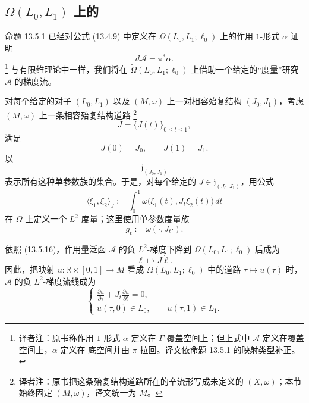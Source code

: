 \subsection{\texorpdfstring{$\Omega(L_0,L_1)$ 上的\termLtwoMetric{}}{道路空间上的 L2 度量}}
\label{subsec:l2-metrics-on-path-space}

命题 13.5.1 已经对公式 (13.4.9) 中定义在
$\Omega(L_0,L_1;\ell_0)$ 上的作用 $1$-形式 $\alpha$ 证明
\[
  d\mathcal A=\pi^*\alpha.
\]
\footnote{译者注：原书称作用 $1$-形式 $\alpha$ 定义在
$\Gamma$-覆盖空间上；但上式中 $\mathcal A$ 定义在覆盖空间上，$\alpha$ 定义在
底空间并由 $\pi$ 拉回。译文依命题 13.5.1 的映射类型补正。}
与有限维\personMorse{}理论中一样，我们将在
$\widetilde\Omega(L_0,L_1;\ell_0)$ 上借助一个给定的“\personRiemann{}度量”研究
$\mathcal A$ 的梯度流。

对每个给定的对子 $(L_0,L_1)$ 以及 $(M,\omega)$ 上一对相容殆复结构
$(J_0,J_1)$，考虑 $(M,\omega)$ 上一条相容殆复结构道路
\footnote{译者注：原书把这条殆复结构道路所在的辛流形写成未定义的
$(X,\omega)$；本节始终固定 $(M,\omega)$，译文统一为 $M$。}
\[
  J=\{J(t)\}_{0\leq t\leq1},
\]
满足
\begin{equation}
  J(0)=J_0,
  \qquad
  J(1)=J_1.
\label{eq:almost-complex-path-endpoints}
\end{equation}
以
\[
  \mathfrak j_{(J_0,J_1)}
\]
表示所有这种单参数族的集合。于是，对每个给定的
$J\in\mathfrak j_{(J_0,J_1)}$，用公式
\[
  \langle\xi_1,\xi_2\rangle_J
  :=
  \int_0^1\omega\bigl(\xi_1(t),J_t\xi_2(t)\bigr)\,dt
\]
在 $\Omega$ 上定义一个 $L^2$-度量；这里使用单参数\personRiemann{}度量族
\[
  g_t:=\omega(\mathord\cdot,J_t\mathord\cdot).
\]

依照 (13.5.16)，作用量泛函 $\mathcal A$ 的负 $L^2$-梯度下降到
$\Omega(L_0,L_1;\ell_0)$ 后成为
\[
  \ell\longmapsto J\dot\ell.
\]
因此，把映射 $u:\mathbb R\times[0,1]\to M$ 看成
$\Omega(L_0,L_1;\ell_0)$ 中的道路 $\tau\mapsto u(\tau)$ 时，$\mathcal A$ 的负
$L^2$-梯度流线成为
\begin{equation}
  \begin{cases}
    \displaystyle
    \frac{\partial u}{\partial\tau}
    +J_t\frac{\partial u}{\partial t}=0,\\[6pt]
    u(\tau,0)\in L_0,\qquad u(\tau,1)\in L_1.
  \end{cases}
\label{eq:unperturbed-floer-strip}
\end{equation}


